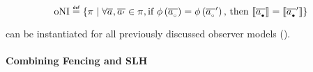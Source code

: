 \documentclass[12pt]{article}
\begin{document}
\begin{definition}{}
  \[
    \text{oNI} \isdef \lrbraces{ \varProperty \mid
    \forall \varTrace,\varTrace[']\in\varProperty,
      \text{if }\phi\lrpars{\varTrace[_\circ]}=\phi\lrpars{\varTrace[_\circ]'}
      \text{, then }\llbracket{\varTrace[_\bullet]}\rrbracket=\llbracket{\varTrace[_\bullet]'}\rrbracket
  }
  \]
\end{definition}

 can be instantiated for all previously discussed observer models ().

\paragraph{Combining Fencing and SLH}



\printglossary

\clearpage


\end{document}
